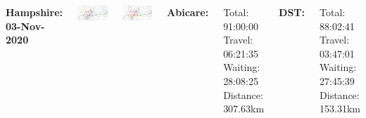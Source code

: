 \documentclass[usenames,dvipsnames]{beamer}
\begin{document}
\begin{frame} %
	\begin{columns}
		\begin{minipage}[c][0.05\textheight][c]{\linewidth}
			\hspace{35mm}
			\textbf{Hampshire: 03-Nov-2020}
		\end{minipage}
		\begin{minipage}[c][0.45\textheight][c]{\linewidth}
			\centering
			\includegraphics[width=0.9\linewidth]{figures/03HampshireAbi}
		\end{minipage}
		\begin{minipage}[c][0.45\textheight][c]{\linewidth}
			\centering
			\includegraphics[width=0.9\linewidth]{figures/03HampshireDST}
		\end{minipage}
		\begin{minipage}[c][0.05\textheight][c]{\linewidth}
		\end{minipage}
		\begin{minipage}[c][0.45\textheight][c]{\linewidth}
			\scriptsize
			\textbf{Abicare:}
			\begin{itemize}
				\setlength{\itemindent}{-.2in}
				\aitem Total: 91:00:00
				\aitem Travel: 06:21:35
				\aitem Waiting: 28:08:25
				\aitem Distance: 307.63km
			\end{itemize}
		\end{minipage}
		\begin{minipage}[c][0.45\textheight][c]{\linewidth}
			\scriptsize
			\textbf{DST:}
			\begin{itemize}
				\setlength{\itemindent}{-.2in}
				\ditem Total: 88:02:41
				\ditem Travel: 03:47:01
				\ditem Waiting: 27:45:39
				\ditem Distance: 153.31km
			\end{itemize}
		\end{minipage}
	\end{columns}
\end{frame}
\end{document}
